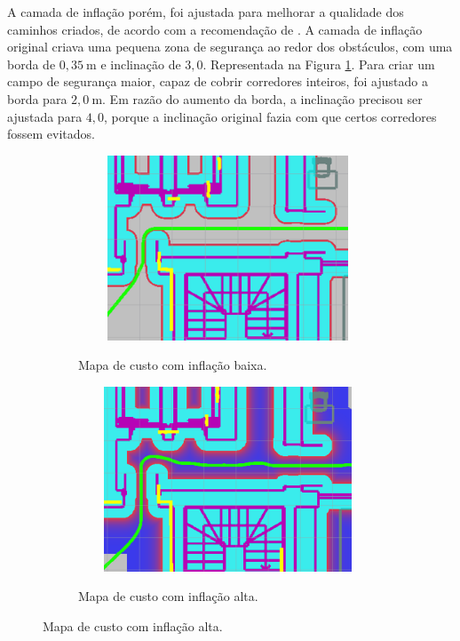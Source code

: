 \documentclass[repeatfields,xlists,xpacks,oneside,yearsonly]{ufrgscca}
\begin{document}
A camada de inflação porém, foi ajustada para melhorar a qualidade
dos  caminhos criados, de acordo com a recomendação de
\textcite{ros_tuning_guide}.  A camada de inflação original criava uma pequena zona de
segurança ao redor dos obstáculos, com uma borda de
$0,35~\si{\meter}$ e inclinação de $3,0$. Representada na Figura
\ref{fig:inflation_low}. Para criar um campo de segurança maior,
capaz de cobrir corredores inteiros, foi ajustado a borda para
$2,0~\si{\meter}$. Em razão do aumento da borda, a inclinação
precisou ser ajustada para $4,0$, porque a inclinação original fazia
com que certos corredores fossem evitados.

\begin{figure}[h]
    \caption{Trajetórias criadas com diferentes configurações da camada de inflação}
    \begin{subfigure}{0.5\linewidth}
        {
            \centering
            \caption{Mapa de custo com inflação baixa.}
            \label{fig:inflation_low}
            \includegraphics[width=0.98\textwidth, height=5.5cm]{costmap_not_inflated.png}\\
        }
    \end{subfigure}
    \begin{subfigure}{0.5\linewidth}
        {
            \centering
            \caption{Mapa de custo com inflação alta.}
            \label{fig:inflation_high}
            \includegraphics[width=0.98\textwidth, height=5.5cm]{costmap_inflated.png}\\
        }
    \end{subfigure}
\end{figure}
\end{document}
